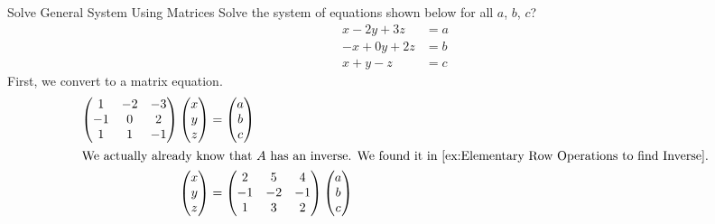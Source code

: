 \begin{example}{Solve General System Using Matrices}
  Solve the system of equations shown below for all $a$, $b$, $c$?
  \begin{align*}
    x - 2y + 3z &= a \\
    -x + 0y + 2z &= b \\
    x + y - z &= c
  \end{align*}
  \tcblower{}
  First, we convert to a matrix equation.
  \begin{align*}
    \begin{pmatrix}
      1 & -2 & -3 \\
      -1 & 0 & 2 \\
      1 & 1 & -1
    \end{pmatrix}
              \begin{pmatrix}
                x \\
                y \\
                z
              \end{pmatrix} &=
                              \begin{pmatrix}
                                a \\
                                b \\
                                c
                              \end{pmatrix} \\
    \intertext{We actually already know that $A$ has an inverse. We found it in \Cref{ex:Elementary Row Operations to find Inverse}.}
    \begin{pmatrix}
      x \\
      y \\
      z \\
    \end{pmatrix} &=
                    \begin{pmatrix}
                      2 & 5 & 4 \\
                      -1 & -2 & -1 \\
                      1 & 3 & 2
                    \end{pmatrix}
                              \begin{pmatrix}
                                a \\
                                b \\
                                c
                              \end{pmatrix} \\

\end{align*}
\end{example}

